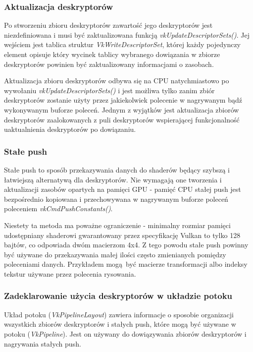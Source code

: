\subsubsection{Aktualizacja deskryptorów}

Po stworzeniu zbioru deskryptorów zawartość jego deskryptorów jest niezdefiniowana i musi być zaktualizowana funkcją
\textit{vkUpdateDescriptorSets()}. Jej wejściem jest tablica struktur \textit{VkWriteDescriptorSet}, której każdy pojedynczy element opisuje
który wycinek tablicy wybranego dowiązania w zbiorze deskryptorów powinien być zaktualizowany informacjami o zasobach.

Aktualizacja zbioru deskryptorów odbywa się na CPU natychmiastowo po wywołaniu \textit{vkUpdateDescriptorSets()} i jest możliwa
tylko zanim zbiór deskryptorów zostanie użyty przez jakiekolwiek polecenie w nagrywanym bądź wykonywanym buforze poleceń.
Jednym z wyjątków jest aktualizacja zbiorów deskryptorów zaalokowanych z puli deskryptorów wspierającej funkcjonalność uaktualnienia deskryptorów po dowiązaniu.

\subsubsection{Stałe push}

Stałe push to sposób przekazywania danych do shaderów będący szybszą i łatwiejszą 
alternatywą dla deskryptorów. Nie wymagają one tworzenia i aktualizacji zasobów opartych na pamięci GPU - pamięć CPU stałej push jest bezpośrednio kopiowana i przechowywana w nagrywanym buforze poleceń poleceniem \textit{vkCmdPushConstants()}.

Niestety ta metoda ma poważne ograniczenie - minimalny rozmiar pamięci udostępniany shaderowi gwarantowany przez specyfikację Vulkan to tylko 128 bajtów, co odpowiada dwóm macierzom 4x4.
Z tego powodu stałe push powinny być używane do przekazywania małej ilości często zmienianych pomiędzy poleceniami danych.
Przykładem mogą być macierze transformacji albo indeksy tekstur używane przez polecenia rysowania.


\subsubsection{Zadeklarowanie użycia deskryptorów w układzie potoku}

Układ potoku (\textit{VkPipelineLayout}) zawiera informacje o sposobie organizacji wszystkich zbiorów deskryptorów i stałych push, które mogą być używane w potoku (\textit{VkPipeline}). Jest on używany do dowiązywania zbiorów deskryptorów i nagrywania stałych push.

